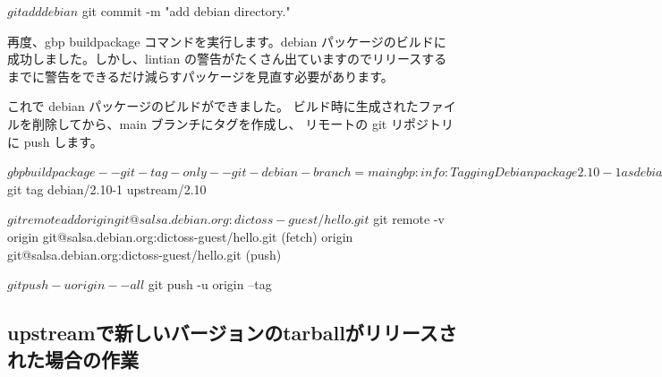 \documentclass[mingoth,a4paper]{jsarticle}
\begin{document}
\begin{commandline}
$ git add debian
$ git commit -m "add debian directory."
\end{commandline}

再度、gbp buildpackage コマンドを実行します。debian パッケージのビルドに成功しました。しかし、lintian の警告がたくさん出ていますのでリリースするまでに警告をできるだけ減らすパッケージを見直す必要があります。


これで debian パッケージのビルドができました。
ビルド時に生成されたファイルを削除してから、main ブランチにタグを作成し、
リモートの git リポジトリに push します。

\begin{commandline}
$ gbp buildpackage --git-tag-only --git-debian-branch=main
gbp:info: Tagging Debian package 2.10-1 as debian/2.10-1 in git

$ git tag
debian/2.10-1
upstream/2.10
\end{commandline}

\begin{commandline}
$ git remote add origin git@salsa.debian.org:dictoss-guest/hello.git
$ git remote -v
origin  git@salsa.debian.org:dictoss-guest/hello.git (fetch)
origin  git@salsa.debian.org:dictoss-guest/hello.git (push)

$ git push -u origin --all
$ git push -u origin --tag
\end{commandline}



\subsection{upstreamで新しいバージョンのtarballがリリースされた場合の作業}
\end{document}
